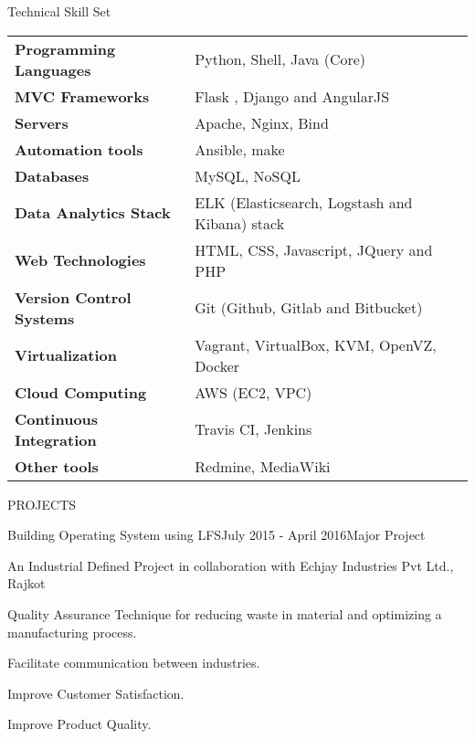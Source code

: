 \documentclass{resume} %
\begin{document}
\begin{rSection}
{Technical Skill Set}

\begin{tabular}{ @{} >{\bfseries}l @{\hspace{6ex}} l }
Programming Languages & Python, Shell, Java (Core) \\
MVC Frameworks & Flask , Django and AngularJS\\
Servers & Apache, Nginx, Bind \\  
Automation tools & Ansible, make \\
Databases &  MySQL, NoSQL \\
Data Analytics Stack & ELK (Elasticsearch, Logstash and Kibana) stack \\
Web Technologies & HTML, CSS, Javascript, JQuery and PHP \\
Version Control Systems & Git (Github, Gitlab and Bitbucket) \\
Virtualization & Vagrant, VirtualBox, KVM, OpenVZ, Docker \\
Cloud Computing & AWS (EC2, VPC) \\
Continuous Integration & Travis CI, Jenkins \\
Other tools & Redmine, MediaWiki

\end{tabular}

\end{rSection}


\begin{rSection}{PROJECTS}

  \begin{rSubsection}
    {Building Operating System using LFS}{July 2015 - April 2016}{Major Project}{}
  \item An Industrial Defined Project in collaboration with Echjay Industries Pvt Ltd., Rajkot
  \item Quality Assurance Technique for reducing waste in material and optimizing a
manufacturing process.
\item Facilitate communication between industries.
\item Improve Customer Satisfaction.
\item Improve Product Quality.
 
\end{rSubsection} 


\end{rSection} 
\end{document}

